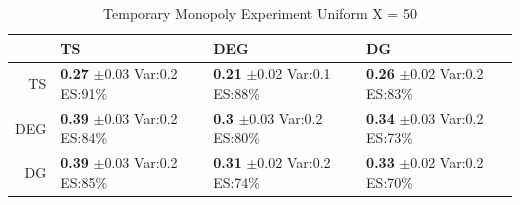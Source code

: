 \documentclass[11pt,letterpaper]{article}
\begin{document}
\begin{table}[H]
\centering
\caption{Temporary Monopoly Experiment Uniform X = 50} 
\begin{tabular}{rlll}
  \hline
 & TS & DEG &  DG \\ 
  \hline
TS & \makecell{\textbf{0.27} $\pm$0.03\\Var:0.2\\ES:91\%} & \makecell{\textbf{0.21} $\pm$0.02\\Var:0.1\\ES:88\%} & \makecell{\textbf{0.26} $\pm$0.02\\Var:0.2\\ES:83\%} \\ 
  DEG & \makecell{\textbf{0.39} $\pm$0.03\\Var:0.2\\ES:84\%} & \makecell{\textbf{0.3} $\pm$0.03\\Var:0.2\\ES:80\%} & \makecell{\textbf{0.34} $\pm$0.03\\Var:0.2\\ES:73\%} \\ 
   DG & \makecell{\textbf{0.39} $\pm$0.03\\Var:0.2\\ES:85\%} & \makecell{\textbf{0.31} $\pm$0.02\\Var:0.2\\ES:74\%} & \makecell{\textbf{0.33} $\pm$0.02\\Var:0.2\\ES:70\%} \\ 
   \hline
\end{tabular}
\end{table}
\end{document}
